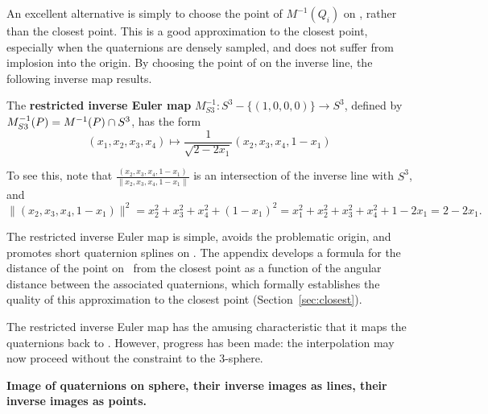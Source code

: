 \documentclass[12pt]{article}
\begin{document}
An excellent alternative is simply to choose the point of $M^{-1}(Q_i)$ on ,
rather than the closest point.
This is a good approximation to the closest point, especially when the quaternions
are densely sampled,
and does not suffer from implosion into the origin.
By choosing the point of  on the inverse line, the following inverse map results.
%
\begin{defn2}
The {\bf restricted inverse Euler map} $M^{-1}_{S3}: S^3 - \{(1,0,0,0)\} \rightarrow S^3$,
defined by $M^{-1}_{S3}(P) = M^{-1}(P) \nolinebreak \cap \nolinebreak S^3$, has the form
\begin{equation}
\label{eq:riem}
(x_1,x_2,x_3,x_4) \mapsto \frac{1}{\sqrt{2-2x_1}}(x_2,x_3,x_4,1-x_1)
\end{equation}
\end{defn2}
%
To see this, note that $\frac{(x_2,x_3,x_4,1-x_1)}{\|x_2,x_3,x_4,1-x_1\|}$ is
an intersection of the inverse line with $S^3$, and
\[
\|(x_2,x_3,x_4,1-x_1)\|^2 = x_2^2 + x_3^2 + x_4^2 + (1-x_1)^2
= x_1^2 + x_2^2 + x_3^2 + x_4^2 + 1 - 2x_1 = 2 - 2x_1.
\]

The restricted inverse Euler map is simple, avoids the problematic origin, 
and promotes short quaternion splines on .
The appendix  develops a formula for the distance of the point on \ from
the closest point as a function of the angular distance between the associated
quaternions, which formally establishes the quality of this approximation to the closest
point (Section~\ref{sec:closest}).

The restricted inverse Euler map has the amusing characteristic that it maps the
quaternions back to .
However, progress has been made:
the interpolation may now proceed without the constraint to the 3-sphere.


{\bf Image of quaternions on sphere, their inverse images as lines, their inverse images
as points.}

\end{document}
